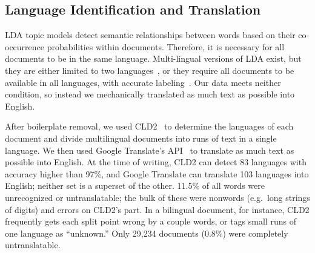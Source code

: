 \subsection{Language Identification and Translation}

LDA topic models detect semantic relationships between words based on
their co-occurrence probabilities within documents.  Therefore, it is
necessary for all documents to be in the same language.
Multi-lingual versions of LDA exist, but they are either limited to
two languages~\cite{duo_lignual_lda_2009}, or they require all
documents to be available in all languages, with accurate
labeling~\cite{polylingual_lda_2009}. Our data meets neither
condition, so instead we mechanically translated as much text as
possible into English.

After boilerplate removal, we used CLD2~\cite{sites.2013.cld2} to
determine the languages of each document and divide multilingual
documents into runs of text in a single language.  We then used Google
Translate's API~\cite{google.nd.translation-api} to translate as much
text as possible into English.  At the time of writing, CLD2 can
detect 83 languages with accuracy higher than 97\%, and Google
Translate can translate 103 languages into English; neither set is a
superset of the other.  11.5\% of all words were unrecognized or
untranslatable; the bulk of these were nonwords (e.g.\ long strings of
digits) and errors on CLD2's part.  In a bilingual document, for
instance, CLD2 frequently gets each split point wrong by a couple
words, or tags small runs of one language as “unknown.”  Only 29,234
documents (0.8\%) were completely untranslatable.

